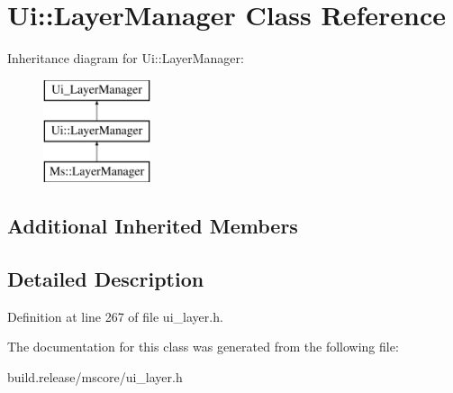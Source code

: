 \hypertarget{class_ui_1_1_layer_manager}{}\section{Ui\+:\+:Layer\+Manager Class Reference}
\label{class_ui_1_1_layer_manager}
Inheritance diagram for Ui\+:\+:Layer\+Manager\+:\begin{figure}[H]
\begin{center}
\leavevmode
\includegraphics[height=3.000000cm]{class_ui_1_1_layer_manager}
\end{center}
\end{figure}
\subsection*{Additional Inherited Members}


\subsection{Detailed Description}


Definition at line 267 of file ui\+\_\+layer.\+h.



The documentation for this class was generated from the following file\+:\begin{DoxyCompactItemize}
\item 
build.\+release/mscore/ui\+\_\+layer.\+h\end{DoxyCompactItemize}
